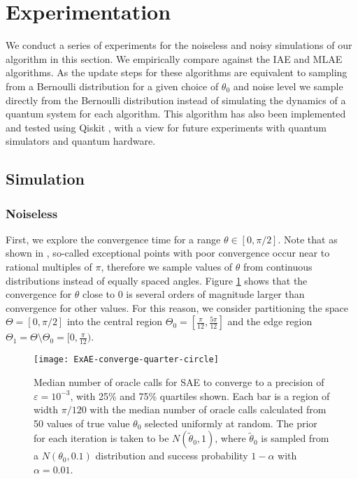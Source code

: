 \section{Experimentation}
We conduct a series of experiments for the noiseless and noisy simulations of our algorithm in this section. We empirically compare against the IAE and MLAE algorithms. As the update steps for these algorithms are equivalent to sampling from a Bernoulli distribution for a given choice of $\theta_0$ and noise level we sample directly from the Bernoulli distribution instead of simulating the dynamics of a quantum system for each algorithm. This algorithm has also been implemented and tested using Qiskit \cite{Qiskit}, with a view for future experiments with quantum simulators and quantum hardware.


\subsection{Simulation}
\subsubsection{Noiseless}
First, we explore the convergence time for a range $\theta \in [0, \pi/2]$. Note that as shown in \cite{callison_2022_amp_with_jitter}, so-called exceptional points with poor convergence occur near to rational multiples of $\pi$, therefore we sample values of $\theta$ from continuous distributions instead of equally spaced angles. Figure \ref{fig::ExAE-converge-quarter-circle} shows that the convergence for $\theta$ close to $0$ is several orders of magnitude larger than convergence for other values. For this reason, we consider partitioning the space $\Theta = [0, \pi/2]$ into the central region $\Theta_0 = [\frac{\pi}{12}, \frac{5 \pi}{12}]$ and the edge region $\Theta_1 = \Theta \setminus \Theta_0 = [0, \frac{\pi}{12})$.

\begin{figure}[htbp]
	\centering
	\texttt{[image: ExAE-converge-quarter-circle]}
	\caption{Median number of oracle calls for SAE to converge to a precision of $\varepsilon = 10^{-3}$, with 25\% and 75\% quartiles shown. Each bar is a region of width $\pi / 120$ with the median number of oracle calls calculated from 50 values of true value $\theta_0$ selected uniformly at random. The prior for each iteration is taken to be $N(\tilde{\theta}_0, 1)$, where $\tilde{\theta}_0$ is sampled from a $N(\theta_0, 0.1)$ distribution and success probability $1 - \alpha$ with $\alpha = 0.01$.}
	\label{fig::ExAE-converge-quarter-circle}
\end{figure}

